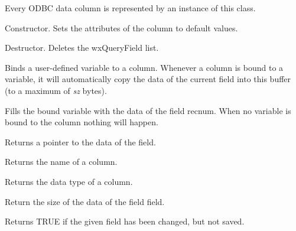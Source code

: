 
Every ODBC data column is represented by an instance of this class.



Constructor. Sets the attributes of the column to default values.



Destructor. Deletes the wxQueryField list.



Binds a user-defined variable to a column. Whenever a column is bound to a
variable, it will automatically copy the data of the current field into this
buffer (to a maximum of {\it sz} bytes).



Fills the bound variable with the data of the field recnum. When no variable
is bound to the column nothing will happen.



Returns a pointer to the data of the field.



Returns the name of a column.
  


Returns the data type of a column.



Return the size of the data of the field field.



Returns TRUE if the given field has been changed, but not saved.

